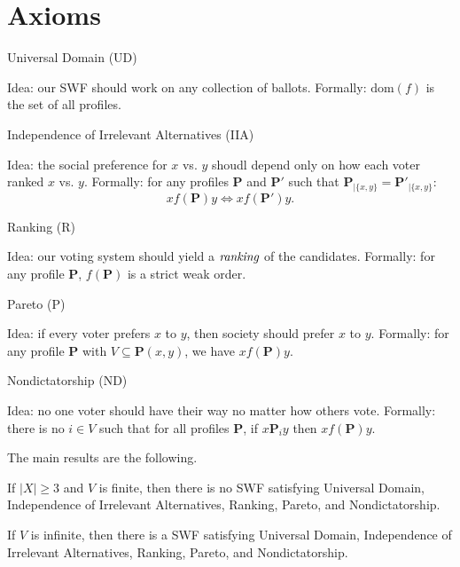 \documentclass[11 pt]{scrartcl}
\newcommand{\BP}{\mathbf{P}}
\begin{document}
\section{Axioms}
\begin{itemize}
    \ii Universal Domain (UD)
    \begin{itemize}[-]
        \ii Idea: our SWF should work on any collection of ballots.
        \ii Formally: $\text{dom}(f)$ is the set of all profiles.
    \end{itemize}
    \ii Independence of Irrelevant Alternatives (IIA)
    \begin{itemize}[-]
        \ii Idea: the social preference for $x$ vs. $y$ shoudl depend only on how each voter ranked $x$ vs. $y$.
        \ii Formally: for any profiles $\BP$ and $\BP'$ such that $\BP_{|\{x,y\}} = \BP'_{|\{x,y\}}$:
        \[ xf(\BP)y \iff xf(\BP')y.\]
    \end{itemize}
    \ii Ranking (R)
    \begin{itemize}[-]
        \ii Idea: our voting system should yield a $\emph{ranking}$ of the candidates.
        \ii Formally: for any profile $\BP$, $f(\BP)$ is a strict weak order.
    \end{itemize}
    \ii Pareto (P)
    \begin{itemize}[-]
        \ii Idea: if every voter prefers $x$ to $y$, then society should prefer $x$ to $y$.
        \ii Formally: for any profile $\BP$ with $V\subseteq \BP(x,y)$, we have $xf(\BP)y$.
    \end{itemize}
    \ii Nondictatorship (ND)
    \begin{itemize}[-]
        \ii Idea: no one voter should have their way no matter how others vote.
        \ii Formally: there is no $i\in V$ such that for all profiles $\BP$, if $x\BP_iy$ then $xf(\BP)y$.
    \end{itemize}
\end{itemize}

The main results are the following.
\begin{theorem}[Arrow 1951]
    If $|X|\geq 3$ and $V$ is finite, then there is no SWF satisfying Universal Domain,
    Independence of Irrelevant Alternatives, Ranking, Pareto, and Nondictatorship.
\end{theorem}

\begin{theorem}[Fishburn 1970]
    If $V$ is infinite, then there is a SWF satisfying Universal Domain,
    Independence of Irrelevant Alternatives, Ranking, Pareto, and Nondictatorship.
\end{theorem}
\end{document}
